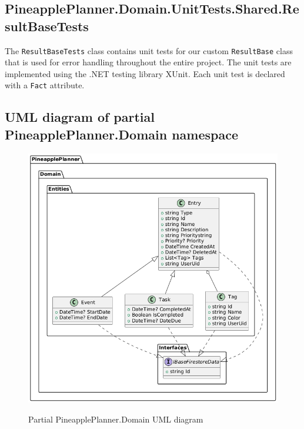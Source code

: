\documentclass{article}
\begin{document}

\bigbreak

\subsection{PineapplePlanner.Domain.UnitTests.Shared.ResultBaseTests}

The \verb|ResultBaseTests| class contains unit tests for our custom \verb|ResultBase| class that is used for error handling throughout the entire project.
The unit tests are implemented using the .NET testing library XUnit.
Each unit test is declared with a \verb|Fact| attribute.


\bigbreak

\subsection{UML diagram of partial PineapplePlanner.Domain namespace}

\begin{figure}[h!]
  \centering
  \includegraphics[width=1\textwidth]{images/domain_uml_diagram.png}
  \label{Partial PineapplePlanner.Domain UML diagram}
  \caption{Partial PineapplePlanner.Domain UML diagram}
\end{figure}
\end{document}
